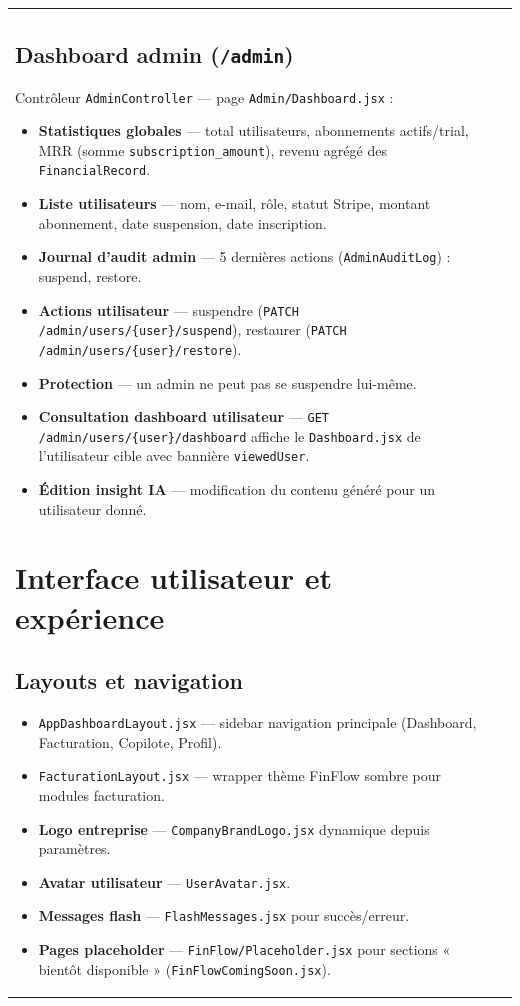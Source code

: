 \documentclass[11pt,a4paper]{report}
\newcommand{\route}[1]{\texttt{\small #1}}
\newcommand{\ctrl}[1]{\texttt{\small #1}}
\newcommand{\model}[1]{\texttt{\small #1}}
\newcommand{\feat}[1]{\textbf{#1}}
\begin{document}
\begin{longtable}{@{}p{3.5cm}p{10.2cm}@{}}
\section{Dashboard admin (\route{/admin})}

Contrôleur \ctrl{AdminController} — page \texttt{Admin/Dashboard.jsx} :

\begin{itemize}[leftmargin=*]
    \item \feat{Statistiques globales} — total utilisateurs, abonnements actifs/trial, MRR (somme \texttt{subscription\_amount}), revenu agrégé des \model{FinancialRecord}.
    \item \feat{Liste utilisateurs} — nom, e-mail, rôle, statut Stripe, montant abonnement, date suspension, date inscription.
    \item \feat{Journal d'audit admin} — 5 dernières actions (\model{AdminAuditLog}) : suspend, restore.
    \item \feat{Actions utilisateur} — suspendre (\route{PATCH /admin/users/\{user\}/suspend}), restaurer (\route{PATCH /admin/users/\{user\}/restore}).
    \item \feat{Protection} — un admin ne peut pas se suspendre lui-même.
    \item \feat{Consultation dashboard utilisateur} — \route{GET /admin/users/\{user\}/dashboard} affiche le \texttt{Dashboard.jsx} de l'utilisateur cible avec bannière \texttt{viewedUser}.
    \item \feat{Édition insight IA} — modification du contenu généré pour un utilisateur donné.
\end{itemize}

\chapter{Interface utilisateur et expérience}

\section{Layouts et navigation}

\begin{itemize}[leftmargin=*]
    \item \texttt{AppDashboardLayout.jsx} — sidebar navigation principale (Dashboard, Facturation, Copilote, Profil).
    \item \texttt{FacturationLayout.jsx} — wrapper thème FinFlow sombre pour modules facturation.
    \item \feat{Logo entreprise} — \texttt{CompanyBrandLogo.jsx} dynamique depuis paramètres.
    \item \feat{Avatar utilisateur} — \texttt{UserAvatar.jsx}.
    \item \feat{Messages flash} — \texttt{FlashMessages.jsx} pour succès/erreur.
    \item \feat{Pages placeholder} — \texttt{FinFlow/Placeholder.jsx} pour sections « bientôt disponible » (\texttt{FinFlowComingSoon.jsx}).
\end{itemize}


\end{longtable}
\end{document}
